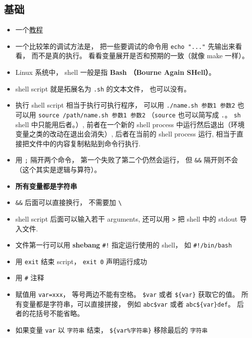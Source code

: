 
\begin{issues}
\issueDraft
\end{issues}


\subsection{基础}
\begin{itemize}
\item 一个\href{https://tldp.org/LDP/abs/html/why-shell.html}{教程}
\item 一个比较笨的调试方法是， 把一些要调试的命令用 \verb`echo "..."` 先输出来看看， 而不是真的执行。 看看变量展开是否和预期的一致（就像 make 一样）。
\item Linux 系统中， shell 一般是指 \textbf{Bash （Bourne Again SHell）}。
\item shell script 就是拓展名为 \verb`.sh` 的文本文件， 也可以没有。
\item 执行 shell script 相当于执行可执行程序， 可以用 \verb`./name.sh 参数1 参数2` 也可以用 \verb`source /path/name.sh 参数1 参数2` （\verb`source` 也可以简写成 \verb`.`。 \verb`sh` shell 中只能用后者。）, 前者在一个新的 shell process 中运行然后退出（环境变量之类的改动在退出会消失）, 后者在当前的 shell process 运行, 相当于直接把文件中的内容复制粘贴到命令行执行.
\item 用 \verb`;` 隔开两个命令， 第一个失败了第二个仍然会运行， 但 \verb`&&` 隔开则不会（这个其实是逻辑与算符）。
\item \textbf{所有变量都是字符串}
\item \verb`&&` 后面可以直接换行， 不需要加 \verb`\`
\item shell script 后面可以输入若干 arguments, 还可以用 \verb`>` 把 shell 中的 stdout 导入文件.
\item 文件第一行可以用 \textbf{shebang} \verb`#!` 指定运行使用的 shell， 如 \verb`#!/bin/bash`
\item 用 \verb`exit` 结束 script， \verb`exit 0` 声明运行成功
\item 用 \verb`#` 注释
\item 赋值用 \verb`var=xxx`， 等号两边不能有空格。 \verb`$var` 或者 \verb`${var}` 获取它的值。 所有变量都是字符串，可以直接拼接， 例如 \verb`abc$var` 或者 \verb`abc${var}def`。 后者的花括号不能省略。
\item 如果变量 \verb`var` 以 \verb`字符串` 结束， \verb`${var%字符串}` 移除最后的 \verb`字符串`

\end{itemize}
